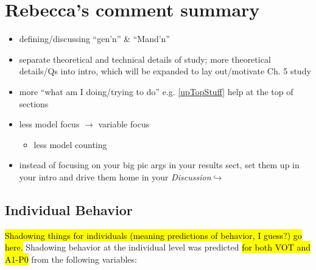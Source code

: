 \section{Rebecca's comment summary}
\begin{itemize}
    \item defining/discussing ``gen'n'' & ``Mand'n''
    \item separate theoretical and technical details of study; more theoretical details/Qs into intro, which will be expanded to lay out/motivate Ch. 5 study
    \item more ``what am I doing/trying to do'' e.g. \ref{upTopStuff} help at the top of sections
    \item less model focus $\rightarrow$ variable focus
    \begin{itemize}
        \item less model counting
    \end{itemize}
    \item instead of focusing on your big pic args in your results sect, set them up in your intro and drive them home in your \emph{Discussion}$\hookrightarrow$
\end{itemize}

\subsection{Individual Behavior}
\hl{Shadowing things for individuals (meaning predictions of behavior, I guess?) go here.} Shadowing behavior at the individual level was predicted \hl{for both VOT and A1-P0} from the following variables:


